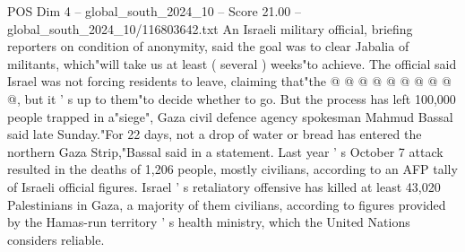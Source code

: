 \begin{textsample}{POS Dim 4 – global\_south\_2024\_10 – Score 21.00 – global\_south\_2024\_10/116803642.txt}
An Israeli military official, briefing reporters on condition of anonymity, said the goal was to clear Jabalia of militants, which"will take us at least ( several ) weeks"to achieve.
The official said Israel was not forcing residents to leave, claiming that"the @ @ @ @ @ @ @ @ @ @, but it ' s up to them"to decide whether to go.
But the process has left 100,000 people trapped in a"siege", Gaza civil defence agency spokesman Mahmud Bassal said late Sunday."For 22 days, not a drop of water or bread has entered the northern Gaza Strip,"Bassal said in a statement.
Last year ' s October 7 attack resulted in the deaths of 1,206 people, mostly civilians, according to an AFP tally of Israeli official figures.
Israel ' s retaliatory offensive has killed at least 43,020 Palestinians in Gaza, a majority of them civilians, according to figures provided by the Hamas-run territory ' s health ministry, which the United Nations considers reliable.

\end{textsample}
